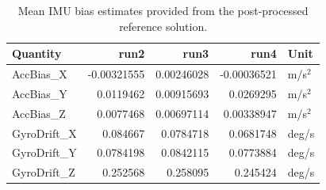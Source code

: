 \begin{table}
\caption{Mean IMU bias estimates provided from the post-processed reference solution.}
\label{tab:provided_imu_biases}
\begin{tabular}{lrrrl}
\toprule
Quantity & run2 & run3 & run4 & Unit \\
\midrule
AccBias\_X & -0.00321555 & 0.00246028 & -0.00036521 & m/s$^2$ \\
AccBias\_Y & 0.0119462 & 0.00915693 & 0.0269295 & m/s$^2$ \\
AccBias\_Z & 0.0077468 & 0.00697114 & 0.00338947 & m/s$^2$ \\
GyroDrift\_X & 0.084667 & 0.0784718 & 0.0681748 & deg/s \\
GyroDrift\_Y & 0.0784198 & 0.0842115 & 0.0773884 & deg/s \\
GyroDrift\_Z & 0.252568 & 0.258095 & 0.245424 & deg/s \\
\bottomrule
\end{tabular}
\end{table}
